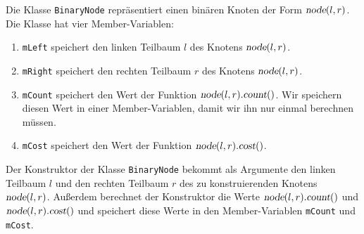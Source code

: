 Die Klasse \texttt{BinaryNode} repr\"asentiert einen bin\"aren Knoten der Form
$\textsl{node}(l,r)$.  Die Klasse hat vier Member-Variablen:
\begin{enumerate}
\item \texttt{mLeft}  speichert den linken  Teilbaum $l$ des Knotens $\textsl{node}(l,r)$.
\item \texttt{mRight} speichert den rechten Teilbaum $r$ des Knotens $\textsl{node}(l,r)$.
\item \texttt{mCount} speichert den Wert der Funktion $\textsl{node}(l,r).\textsl{count}()$.
      Wir speichern diesen Wert in einer Member-Variablen, damit wir ihn nur einmal berechnen
      m\"ussen.
\item \texttt{mCost}  speichert den Wert der Funktion $\textsl{node}(l,r).\textsl{cost}()$.
\end{enumerate}
Der Konstruktor der Klasse \texttt{BinaryNode} bekommt als Argumente den linken Teilbaum $l$ und den
rechten Teilbaum $r$ des zu konstruierenden Knotens $\textsl{node}(l,r)$.  Au{\ss}erdem berechnet der
Konstruktor die Werte $\textsl{node}(l,r).\textsl{count}()$ und $\textsl{node}(l,r).\textsl{cost}()$
und speichert diese Werte in den Member-Variablen \texttt{mCount} und \texttt{mCost}.



